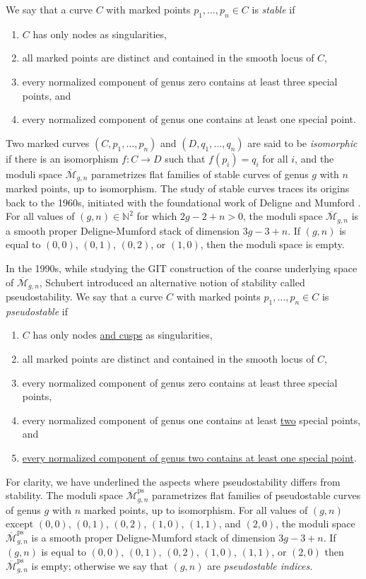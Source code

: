 \documentclass[12pt]{amsart}
\newcounter{intro}[section]
\theoremstyle{definition}
\newcommand{\M}{\overline{\mathcal{M}}}
\newcommand{\ps}{\mathrm{ps}}
\newcommand{\N}{\mathbb{N}}
\numberwithin{equation}{section}
\begin{document}
We say that a curve $C$ with marked points $p_1,\dots,p_n\in C$ is \emph{stable} if
\begin{enumerate}
\item $C$ has only nodes as singularities,
\item all marked points are distinct and contained in the smooth locus of $C$,
\item every normalized component of genus zero contains at least three special points, and
\item every normalized component of genus one contains at least one special point.
\end{enumerate}
Two marked curves $(C,p_1,\dots,p_n)$ and $(D,q_1,\dots,q_n)$ are said to be \emph{isomorphic} if there is an isomorphism $f:C\rightarrow D$ such that $f(p_i)=q_i$ for all $i$, and the moduli space $\M_{g,n}$ parametrizes flat families of stable curves of genus $g$ with $n$ marked points, up to isomorphism. The study of stable curves traces its origins back to the 1960s, initiated with the foundational work of Deligne and Mumford \cite{DeligneMumford}.  For all values of $(g,n)\in\N^2$ for which $2g-2+n>0$, the moduli space $\M_{g,n}$ is a smooth proper Deligne-Mumford stack of dimension $3g-3+n$. If $(g,n)$ is equal to $(0,0)$, $(0,1)$, $(0,2)$, or $(1,0)$, then the moduli space is empty.

In the 1990s, while studying the GIT construction of the coarse underlying space of $\M_{g,n}$, Schubert introduced an alternative notion of stability \cite{Schubert} called pseudostability. We say that a curve $C$ with marked points $p_1,\dots,p_n\in C$ is \emph{pseudostable} if
\begin{enumerate}
\item $C$ has only nodes \underline{and cusps} as singularities,
\item all marked points are distinct and contained in the smooth locus of $C$,
\item every normalized component of genus zero contains at least three special points, 
\item every normalized component of genus one contains at least \underline{two} special points, and
\item \underline{every normalized component of genus two contains at least one special point}.
\end{enumerate}
For clarity, we have underlined the aspects where pseudostability differs from stability. The moduli space $\M_{g,n}^\ps$ parametrizes flat families of pseudostable curves of genus $g$ with $n$ marked points, up to isomorphism. For all values of $(g,n)$ except $(0,0)$, $(0,1)$, $(0,2)$, $(1,0)$, $(1,1)$, and $(2,0)$, the moduli space $\M_{g,n}^\ps$ is a smooth proper Deligne-Mumford stack of dimension $3g-3+n$.  If $(g,n)$ is equal to $(0,0)$, $(0,1)$, $(0,2)$, $(1,0)$, $(1,1)$, or $(2,0)$ then $\M_{g,n}^\ps$ is empty; otherwise we say that $(g,n)$ are \emph{pseudostable indices}.
\end{document}
